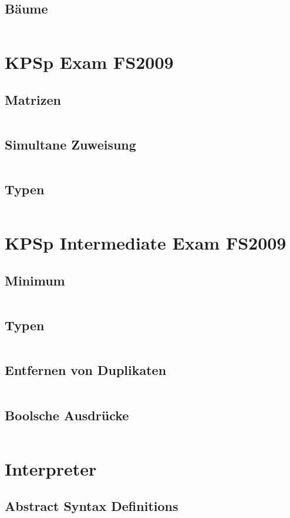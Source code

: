 \documentclass[a4paper,9pt,twoside]{book}
\newcommand{\hsfile}[1]{\inputminted[breaklines]{haskell}{../haskell/#1.hs}}
\begin{document}
\section{Bäume}
\hsfile{exami2010/problem_4}

\chapter{KPSp Exam FS2009}
\section{Matrizen}
\hsfile{exam2009/problem_1}
\section{Simultane Zuweisung}
\hsfile{exam2009/problem_2}
\section{Typen}
\hsfile{exam2009/problem_3}

\chapter{KPSp Intermediate Exam FS2009}
\section{Minimum}
\hsfile{exami2009/problem_1}
\section{Typen}
\hsfile{exami2009/problem_2}
\section{Entfernen von Duplikaten}
\hsfile{exami2009/problem_3}
\section{Boolsche Ausdrücke}
\hsfile{exami2009/problem_4}

\chapter{Interpreter}
\section{Abstract Syntax Definitions}
\hsfile{interpreter/AbsSyn}
\end{document}
